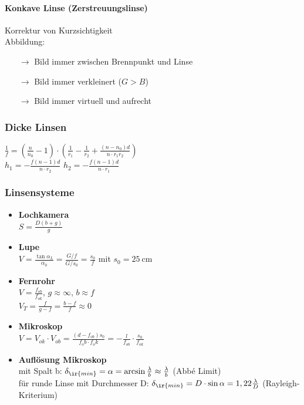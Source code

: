\documentclass[german]{latex4ei/latex4ei_sheet}
\begin{document}
\begin{sectionbox}
\paragraph{Konkave Linse (Zerstreuungslinse)}
Korrektur von Kurzsichtigkeit\\
Abbildung:
\begin{itemize}
\item[$\rightarrow$] Bild immer zwischen Brennpunkt und Linse
\item[$\rightarrow$] Bild immer verkleinert ($G>B$)
\item[$\rightarrow$] Bild immer virtuell und aufrecht
\end{itemize}

\subsubsection{Dicke Linsen}
$\frac{1}{f}=(\frac{n}{n_0}-1)\cdot(\frac{1}{r_1}-\frac{1}{r_2}+\frac{(n-n_0)d}{n \cdot r_1 r_2})$\\
$h_1=-\frac{f(n-1)d}{n \cdot r_2}$ \qquad $h_2=-\frac{f(n-1)d}{n \cdot r_1}$

\subsubsection{Linsensysteme}
\begin{itemize}
	\item \textbf{Lochkamera} \\
		$S=\frac{D(b+g)}{g}$
	\item \textbf{Lupe} \\
		$V=\frac{\tan \alpha_L}{\alpha_0}=\frac{G/f}{G/s_0}=\frac{s_0}{f}$ mit $s_0=\SI{25}{\centi \meter}$
	\item \textbf{Fernrohr} \\
		$V=\frac{f_{ob}}{f_{ok}}$, $g\approx \infty$, $b\approx f$ \\
		$V_T=\frac{f}{g-f}=\frac{b-f}{f}\approx 0$
	\item \textbf{Mikroskop} \\
		$V=V_{ok}\cdot V_{ob}=\frac{(d-f_{ob})s_0}{f_ob \cdot f_ok}=-\frac{l}{f_{ob}}\cdot \frac{s_0}{f_{ok}}$
	\item \textbf{Auflösung Mikroskop} \\
	mit Spalt b: $\delta_{\ir{min}} = \alpha = \arcsin\frac{\lambda}{b} \approx \frac{\lambda}{b}$ (Abbé Limit)\\
	für runde Linse mit Durchmesser D: $\delta_{\ir{min}} = D\cdot\sin\alpha = 1,22\frac{\lambda}{D}$ (Rayleigh-Kriterium)\\
\end{itemize}
\end{sectionbox}
\end{document}
